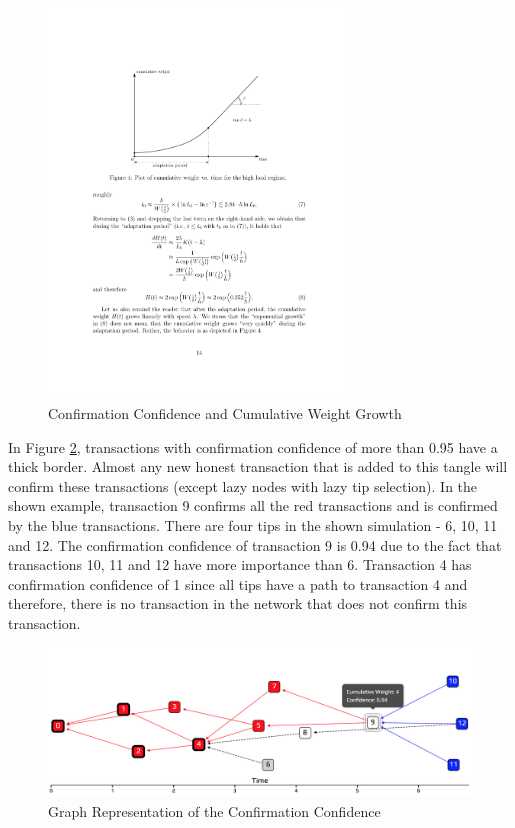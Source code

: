 \begin{figure}[H]
    \centering
    \includegraphics[width=8cm]{images/confirmation-confidence.pdf}
    \caption{Confirmation Confidence and Cumulative Weight Growth \cite{the-tangle}}
    \label{fig:confirmation-confidence}
\end{figure}

In Figure \ref{fig:confirmation-confidence-tangle}, transactions with confirmation confidence of more than 0.95 have a thick border. Almost any new honest transaction that is added to this tangle will confirm these transactions (except lazy nodes with lazy tip selection). In the shown example, transaction 9 confirms all the red transactions and is confirmed by the blue transactions. There are four tips in the shown simulation - 6, 10, 11 and 12. The confirmation confidence of transaction 9 is 0.94 due to the fact that transactions 10, 11 and 12 have more importance than 6.
Transaction 4 has confirmation confidence of 1 since all tips have a path to transaction 4 and therefore, there is no transaction in the network that does not confirm this transaction.

\begin{figure}[H]
    \centering
    \includegraphics[width=1.0\textwidth]{images/confirmation-confidence-tangle.png}
    \caption{Graph Representation of the Confirmation Confidence}
    \label{fig:confirmation-confidence-tangle}
\end{figure}

